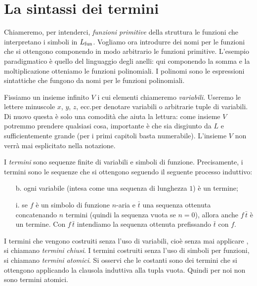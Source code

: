\section{La sintassi dei termini}\label{terminidef}
Chiameremo, per intenderci, \textit{funzioni primitive\/} della struttura le funzioni che interpretano i simboli in $L_{\rm fun}$. Vogliamo ora introdurre dei nomi per le funzioni che si ottengono componendo in modo arbitrario le funzioni primitive. L'esempio paradigmatico \`e quello del linguaggio degli anelli: qui componendo la somma e la moltiplicazione otteniamo le funzioni polinomiali. I polinomi sono le espressioni sintattiche che fungono da nomi per le funzioni polinomiali.

Fissiamo un insieme infinito $V$ i cui elementi chiameremo \emph{variabili}. Useremo le lettere minuscole $x$, $y$, $z$, ecc.\@ per denotare variabili o arbitrarie tuple di variabili. Di nuovo questa \`e solo una comodit\`a che aiuta la lettura: come insieme $V$ potremmo prendere qualsiasi cosa, importante \`e che sia disgiunto da $L$ e sufficientemente grande (per i primi capitoli basta numerabile). L'insieme $V$ non verr\`a mai esplicitato nella notazione.

\begin{definition}\label{deftermine} 
I \emph{termini\/} sono sequenze finite di variabili e simboli di funzione. Precisamente, i termini sono le sequenze che si ottengono seguendo il seguente processo induttivo:

\begin{itemize}
\item[b.] ogni variabile (intesa come una sequenza di lunghezza $1$) \`e un termine;
\item[i.] se $f$ \`e un simbolo di funzione $n$-aria e $\bar t$ una sequenza ottenuta concatenando $n$ termini (quindi la sequenza vuota se $n=0$), allora anche $f\,\bar t$ \`e un termine. Con $f\,\bar t$ intendiamo la sequenza ottenuta prefissando $\bar t$ con $f$.\QED
\end{itemize}
\end{definition}

I termini che vengono costruiti senza l'uso di variabili, cio\`e senza mai applicare , si chiamano \emph{termini chiusi}.  I termini costruiti senza l'uso di simboli per funzioni, si chiamano \emph{termini atomici}. Si osservi che le costanti sono dei termini che si ottengono applicando la clausola induttiva  alla tupla vuota. Quindi per noi non sono termini atomici.%

